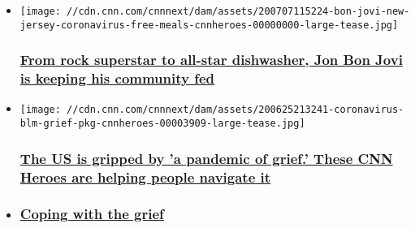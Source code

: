 \begin{itemize}
\item
  \href{/2020/07/09/us/bon-jovi-new-jersey-meals-pandemic-cnnheroes/index.html}{}

  \texttt{[image: //cdn.cnn.com/cnnnext/dam/assets/200707115224-bon-jovi-new-jersey-coronavirus-free-meals-cnnheroes-00000000-large-tease.jpg]}

  \hypertarget{from-rock-superstar-to-all-star-dishwasher-jon-bon-jovi-is-keeping-his-community-fed}{%
  \subsubsection{\texorpdfstring{\href{/2020/07/09/us/bon-jovi-new-jersey-meals-pandemic-cnnheroes/index.html}{From
  rock superstar to all-star dishwasher, Jon Bon Jovi is keeping his
  community
  fed}}{From rock superstar to all-star dishwasher, Jon Bon Jovi is keeping his community fed}}\label{from-rock-superstar-to-all-star-dishwasher-jon-bon-jovi-is-keeping-his-community-fed}}
\end{itemize}

\begin{itemize}
\item
  \href{/2020/06/25/health/coronavirus-blm-grief-loss-coping-cnnheroes/index.html}{}

  \texttt{[image: //cdn.cnn.com/cnnnext/dam/assets/200625213241-coronavirus-blm-grief-pkg-cnnheroes-00003909-large-tease.jpg]}

  \hypertarget{the-us-is-gripped-by-a-pandemic-of-grief-these-cnn-heroes-are-helping-people-navigate-it}{%
  \subsubsection{\texorpdfstring{\href{/2020/06/25/health/coronavirus-blm-grief-loss-coping-cnnheroes/index.html}{The
  US is gripped by 'a pandemic of grief.' These CNN Heroes are helping
  people navigate
  it}}{The US is gripped by 'a pandemic of grief.' These CNN Heroes are helping people navigate it}}\label{the-us-is-gripped-by-a-pandemic-of-grief-these-cnn-heroes-are-helping-people-navigate-it}}
\item
  \hypertarget{coping-with-the-grief-}{%
  \subsubsection{\texorpdfstring{\href{/videos/health/2020/06/25/coronavirus-blm-grief-cnnheroes.cnn}{Coping
  with the grief
  }}{Coping with the grief }}\label{coping-with-the-grief-}}
\end{itemize}

